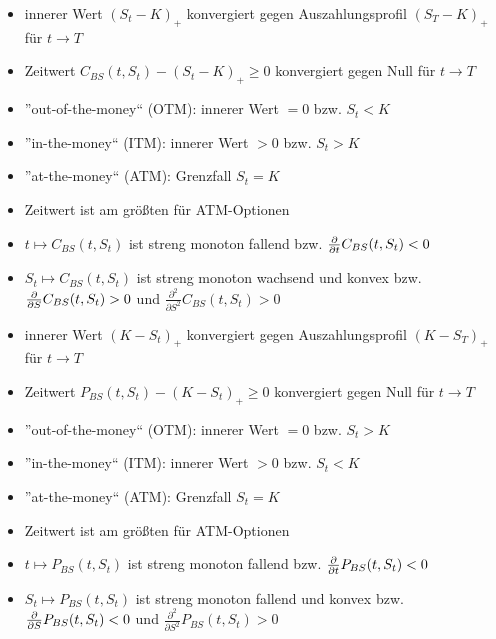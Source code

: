 \begin{*bemerkung}
	\begin{itemize}[nolistsep]
		\item innerer Wert $(S_t - K)_+$ konvergiert gegen Auszahlungsprofil $(S_T - K)_+$ für $t \to T$
		\item Zeitwert $C_{BS}(t,S_t) - (S_t - K)_+ \ge 0$ konvergiert gegen Null für $t \to T$
		\item ''out-of-the-money`` (OTM): innerer Wert $ = 0$ bzw. $S_t < K$
		\item ''in-the-money`` (ITM): innerer Wert $> 0$ bzw. $S_t > K$
		\item ''at-the-money`` (ATM): Grenzfall $S_t = K$
		\item Zeitwert ist am größten für ATM-Optionen
		\item $t \mapsto C_{BS}(t,S_t)$ ist streng monoton fallend bzw. $\frac{\partial}{\partial t } C_{BS}(t,S_t) < 0$
		\item $S_t \mapsto C_{BS}(t,S_t)$ ist streng monoton wachsend und konvex bzw. $\frac{\partial}{\partial S }C_{BS}(t,S_t) > 0$ und $\frac{\partial^2}{\partial S^2} C_{BS}(t,S_t) > 0$
	\end{itemize}
\end{*bemerkung}

\begin{*bemerkung}
	\begin{itemize}[nolistsep]
		\item innerer Wert $(K - S_t)_+$ konvergiert gegen Auszahlungsprofil $(K - S_T)_+$ für $t \to T$
		\item Zeitwert $P_{BS}(t,S_t) - (K - S_t)_+ \ge 0$ konvergiert gegen Null für $t \to T$
		\item ''out-of-the-money`` (OTM): innerer Wert $ = 0$ bzw. $S_t > K$
		\item ''in-the-money`` (ITM): innerer Wert $> 0$ bzw. $S_t < K$
		\item ''at-the-money`` (ATM): Grenzfall $S_t = K$
		\item Zeitwert ist am größten für ATM-Optionen
		\item $t \mapsto P_{BS}(t,S_t)$ ist streng monoton fallend bzw. $\frac{\partial}{\partial t } P_{BS}(t,S_t) < 0$
		\item $S_t \mapsto P_{BS}(t,S_t)$ ist streng monoton fallend und konvex bzw. $\frac{\partial}{\partial S } P_{BS}(t,S_t) < 0$ und $\frac{\partial^2}{\partial S^2} P_{BS}(t,S_t) > 0$
	\end{itemize}
\end{*bemerkung}


